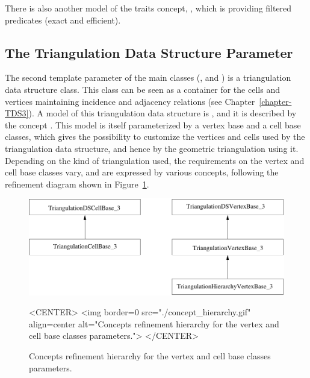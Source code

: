 There is also another model of the traits concept,
, which is providing filtered
predicates (exact and efficient).

\subsection{The Triangulation Data Structure Parameter}
\label{Triangulation3-sec-tds}

The second template parameter of the main classes (,
 and ) is a
triangulation data structure class.  This class can be seen as a container for
the cells and vertices maintaining incidence and adjacency relations (see
Chapter~\ref{chapter-TDS3}).  A model of this triangulation data structure is
,
and it is described by the  concept
.  This model is itself
parameterized by a vertex base and a cell base classes, which gives the
possibility to customize the vertices and cells used by the triangulation data
structure, and hence by the geometric triangulation using it.  Depending on the
kind of triangulation used, the requirements on the vertex and cell base
classes vary, and are expressed by various concepts, following the refinement
diagram shown in Figure~\ref{T3-concept-hierarchy}.

\begin{figure}[htbp]
\begin{ccTexOnly}
\begin{center}
\includegraphics[width=13cm]{Triangulation_3/concept_hierarchy}
\end{center}
\end{ccTexOnly}
\caption{Concepts refinement hierarchy for the vertex and cell base classes
parameters.
\label{T3-concept-hierarchy}}
\begin{ccHtmlOnly}
<CENTER>
<img border=0 src="./concept_hierarchy.gif" align=center
 alt="Concepts refinement hierarchy for the vertex and cell base classes
parameters.">
</CENTER>
\end{ccHtmlOnly}
\end{figure}

